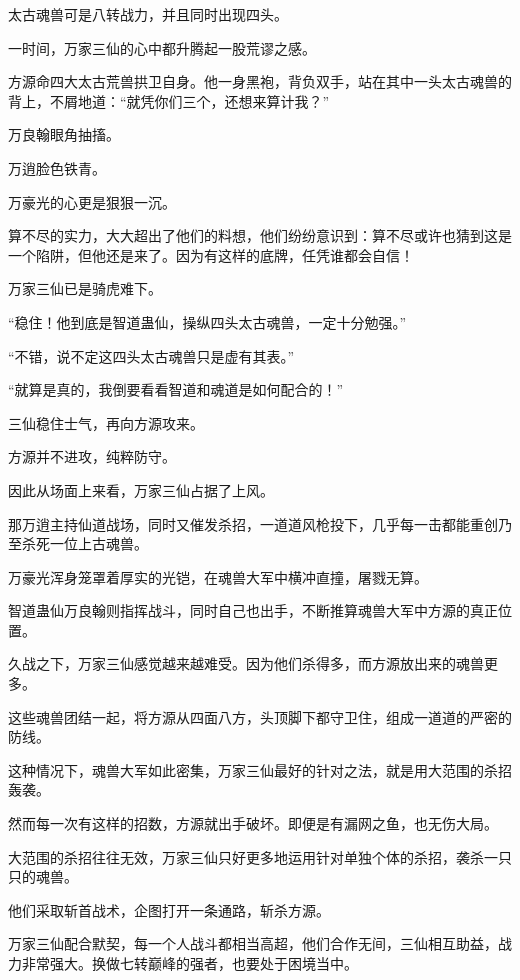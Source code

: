 
\begin{this_body}

太古魂兽可是八转战力，并且同时出现四头。

一时间，万家三仙的心中都升腾起一股荒谬之感。

方源命四大太古荒兽拱卫自身。他一身黑袍，背负双手，站在其中一头太古魂兽的背上，不屑地道：“就凭你们三个，还想来算计我？”

万良翰眼角抽搐。

万逍脸色铁青。

万豪光的心更是狠狠一沉。

算不尽的实力，大大超出了他们的料想，他们纷纷意识到：算不尽或许也猜到这是一个陷阱，但他还是来了。因为有这样的底牌，任凭谁都会自信！

万家三仙已是骑虎难下。

“稳住！他到底是智道蛊仙，操纵四头太古魂兽，一定十分勉强。”

“不错，说不定这四头太古魂兽只是虚有其表。”

“就算是真的，我倒要看看智道和魂道是如何配合的！”

三仙稳住士气，再向方源攻来。

方源并不进攻，纯粹防守。

因此从场面上来看，万家三仙占据了上风。

那万逍主持仙道战场，同时又催发杀招，一道道风枪投下，几乎每一击都能重创乃至杀死一位上古魂兽。

万豪光浑身笼罩着厚实的光铠，在魂兽大军中横冲直撞，屠戮无算。

智道蛊仙万良翰则指挥战斗，同时自己也出手，不断推算魂兽大军中方源的真正位置。

久战之下，万家三仙感觉越来越难受。因为他们杀得多，而方源放出来的魂兽更多。

这些魂兽团结一起，将方源从四面八方，头顶脚下都守卫住，组成一道道的严密的防线。

这种情况下，魂兽大军如此密集，万家三仙最好的针对之法，就是用大范围的杀招轰袭。

然而每一次有这样的招数，方源就出手破坏。即便是有漏网之鱼，也无伤大局。

大范围的杀招往往无效，万家三仙只好更多地运用针对单独个体的杀招，袭杀一只只的魂兽。

他们采取斩首战术，企图打开一条通路，斩杀方源。

万家三仙配合默契，每一个人战斗都相当高超，他们合作无间，三仙相互助益，战力非常强大。换做七转巅峰的强者，也要处于困境当中。


\end{this_body}

